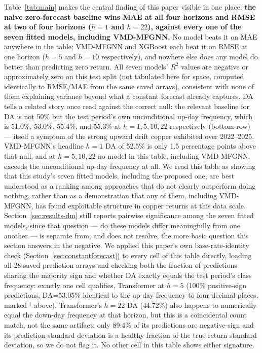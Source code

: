 \documentclass[journal]{IEEEtran}
\begin{document}
Table~\ref{tab:main} makes the central finding of this paper visible in one place: \textbf{the naive zero-forecast baseline wins MAE at all four horizons and RMSE at two of four horizons ($h=1$ and $h=22$), against every one of the seven fitted models, including VMD-MFGNN.} No model beats it on MAE anywhere in the table; VMD-MFGNN and XGBoost each beat it on RMSE at one horizon ($h=5$ and $h=10$ respectively), and nowhere else does any model do better than predicting zero return. All seven models' $R^2$ values are negative or approximately zero on this test split (not tabulated here for space, computed identically to RMSE/MAE from the same saved arrays), consistent with none of them explaining variance beyond what a constant forecast already captures. DA tells a related story once read against the correct null: the relevant baseline for DA is not 50\% but the test period's own unconditional up-day frequency, which is 51.0\%, 53.0\%, 55.4\%, and 55.3\% at $h=1,5,10,22$ respectively (bottom row) --- itself a symptom of the strong upward drift copper exhibited over 2022--2025. VMD-MFGNN's headline $h=1$ DA of 52.5\% is only 1.5 percentage points above that null, and at $h=5,10,22$ no model in this table, including VMD-MFGNN, exceeds the unconditional up-day frequency at all. We read this table as showing that this study's seven fitted models, including the proposed one, are best understood as a ranking among approaches that do not clearly outperform doing nothing, rather than as a demonstration that any of them, including VMD-MFGNN, has found exploitable structure in copper returns at this data scale. Section~\ref{sec:results-dm} still reports pairwise significance among the seven fitted models, since that question --- do these models differ meaningfully from one another --- is separate from, and does not resolve, the more basic question this section answers in the negative. We applied this paper's own base-rate-identity check (Section~\ref{sec:constantforecast}) to every cell of this table directly, loading all 28 saved prediction arrays and checking both the fraction of predictions sharing the majority sign and whether DA exactly equals the test period's class frequency: exactly one cell qualifies, Transformer at $h=5$ (100\% positive-sign predictions, DA=53.05\% identical to the up-day frequency to four decimal places, marked $^{\ddagger}$ above). Transformer's $h=22$ DA (44.72\%) also happens to numerically equal the down-day frequency at that horizon, but this is a coincidental count match, not the same artifact: only 89.4\% of its predictions are negative-sign and its prediction standard deviation is a healthy fraction of the true-return standard deviation, so we do not flag it. No other cell in this table shows either signature.
\end{document}
